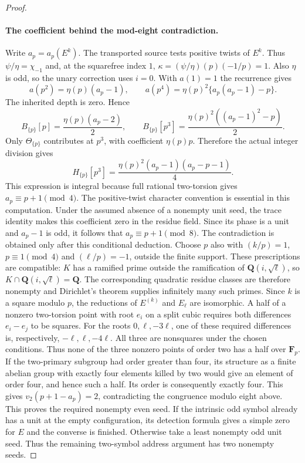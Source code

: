 \documentclass[11pt]{article}
\theoremstyle{definition}
\theoremstyle{remark}
\begin{document}
\begin{proof}
\paragraph{The coefficient behind the mod-eight contradiction.}
Write $a_p=a_p(E^k)$. The transported source tests positive twists of $E^k$. Thus
$\psi/\eta=\chi_{-1}$ and, at the squarefree index $1$,
$\kappa=(\psi/\eta)(p)(-1/p)=1$. Also $\eta$ is odd, so
the unary correction uses $i=0$. With $a(1)=1$ the recurrence gives
\[
 a(p^2)=\eta(p)(a_p-1),\qquad
 a(p^4)=\eta(p)^2\{a_p(a_p-1)-p\}.
\]
The inherited depth is zero. Hence
\[
 B_{\{p\}}[p]=\frac{\eta(p)(a_p-2)}2,\qquad
 B_{\{p\}}[p^3]=\frac{\eta(p)^2((a_p-1)^2-p)}2.
\]
Only $\Theta_{\{p\}}$ contributes at $p^3$, with coefficient
$\eta(p)p$. Therefore the actual integer division gives
\[
 H_{\{p\}}[p^3]
   =\frac{\eta(p)^2(a_p-1)(a_p-p-1)}4.
\]
This expression is integral because full rational two-torsion gives
$a_p\equiv p+1\pmod4$. The positive-twist character convention is
essential in this computation. Under the assumed absence of a
nonempty unit seed, the trace identity makes this coefficient zero
in the residue field. Since its phase is a unit and $a_p-1$ is odd,
it follows that $a_p\equiv p+1\pmod8$. The contradiction is obtained
only after this conditional deduction.
Choose $p$ also with $(k/p)=1$, $p\equiv1\pmod4$ and
$(\ell/p)=-1$, outside the finite support.  These prescriptions
are compatible: $K$ has a ramified prime outside the ramification
of $\mathbf Q(i,\sqrt\ell)$, so
$K\cap\mathbf Q(i,\sqrt\ell)=\mathbf Q$.  The corresponding
quadratic residue classes are therefore nonempty and Dirichlet's
theorem supplies infinitely many such primes.  Since $k$ is a
square modulo $p$, the reductions of $E^{(k)}$ and $E_\ell$ are
isomorphic.  A half of a nonzero two-torsion point with root $e_i$
on a split cubic requires both differences $e_i-e_j$ to be
squares.  For the roots $0,\ell,-3\ell$, one of these required
differences is, respectively, $-\ell,\ell,-4\ell$.  All three are
nonsquares under the chosen conditions.  Thus none of the three
nonzero points of order two has a half over $\mathbf F_p$.
If the two-primary subgroup had order greater than four, its
structure as a finite abelian group with exactly four elements
killed by two would give an element of order four, and hence such
a half.  Its order is consequently exactly four.  This gives
$v_2(p+1-a_p)=2$, contradicting the congruence modulo eight above.
This proves the required nonempty even seed. If the intrinsic odd
symbol already has a unit at the empty configuration, its detection
formula gives a simple zero for $E$ and the converse is finished.
Otherwise take a least nonempty odd unit seed. Thus the remaining
two-symbol address argument has two nonempty seeds.
\end{proof}
\end{document}
